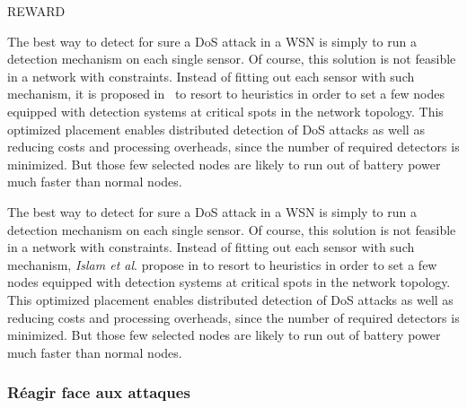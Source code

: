 REWARD


The best way to detect for sure a DoS attack in a WSN is simply to run a detection mechanism on each single sensor.
Of course, this solution is not feasible in a network with constraints.
Instead of fitting out each sensor with such mechanism, it is proposed in~\cite{INK09} to resort to heuristics in order to set a few nodes equipped with detection systems at critical spots in the network topology.
This optimized placement enables distributed detection of DoS attacks as well as reducing costs and processing overheads, since the number of required detectors is minimized.
But those few selected nodes are likely to run out of battery power much faster than normal nodes.

The best way to detect for sure a DoS attack in a WSN is simply to run a detection mechanism on each single sensor.
Of course, this solution is not feasible in a network with constraints.
Instead of fitting out each sensor with such mechanism, \textit{Islam et al}. propose in
\cite{INK09}
to resort to heuristics in order to set a few nodes equipped with detection systems at critical spots in the network topology.
This optimized placement enables distributed detection of DoS attacks as well as reducing costs and processing overheads, since the number of required detectors is minimized.
But those few selected nodes are likely to run out of battery power much faster than normal nodes.

\subsubsection{Réagir face aux attaques}

